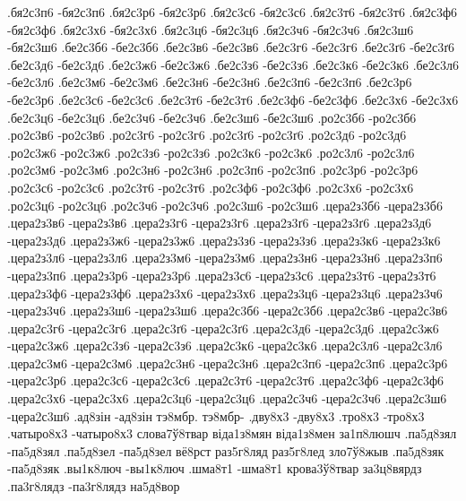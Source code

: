{.бя2с3п6 -бя2с3п6
.бя2с3р6 -бя2с3р6
.бя2с3с6 -бя2с3с6
.бя2с3т6 -бя2с3т6
.бя2с3ф6 -бя2с3ф6
.бя2с3х6 -бя2с3х6
.бя2с3ц6 -бя2с3ц6
.бя2с3ч6 -бя2с3ч6
.бя2с3ш6 -бя2с3ш6
.бе2с3б6 -бе2с3б6
.бе2с3в6 -бе2с3в6
.бе2с3г6 -бе2с3г6
.бе2с3ґ6 -бе2с3ґ6
.бе2с3д6 -бе2с3д6
.бе2с3ж6 -бе2с3ж6
.бе2с3з6 -бе2с3з6
.бе2с3к6 -бе2с3к6
.бе2с3л6 -бе2с3л6
.бе2с3м6 -бе2с3м6
.бе2с3н6 -бе2с3н6
.бе2с3п6 -бе2с3п6
.бе2с3р6 -бе2с3р6
.бе2с3с6 -бе2с3с6
.бе2с3т6 -бе2с3т6
.бе2с3ф6 -бе2с3ф6
.бе2с3х6 -бе2с3х6
.бе2с3ц6 -бе2с3ц6
.бе2с3ч6 -бе2с3ч6
.бе2с3ш6 -бе2с3ш6
.ро2с3б6 -ро2с3б6
.ро2с3в6 -ро2с3в6
.ро2с3г6 -ро2с3г6
.ро2с3ґ6 -ро2с3ґ6
.ро2с3д6 -ро2с3д6
.ро2с3ж6 -ро2с3ж6
.ро2с3з6 -ро2с3з6
.ро2с3к6 -ро2с3к6
.ро2с3л6 -ро2с3л6
.ро2с3м6 -ро2с3м6
.ро2с3н6 -ро2с3н6
.ро2с3п6 -ро2с3п6
.ро2с3р6 -ро2с3р6
.ро2с3с6 -ро2с3с6
.ро2с3т6 -ро2с3т6
.ро2с3ф6 -ро2с3ф6
.ро2с3х6 -ро2с3х6
.ро2с3ц6 -ро2с3ц6
.ро2с3ч6 -ро2с3ч6
.ро2с3ш6 -ро2с3ш6
.цера2з3б6 -цера2з3б6
.цера2з3в6 -цера2з3в6
.цера2з3г6 -цера2з3г6
.цера2з3ґ6 -цера2з3ґ6
.цера2з3д6 -цера2з3д6
.цера2з3ж6 -цера2з3ж6
.цера2з3з6 -цера2з3з6
.цера2з3к6 -цера2з3к6
.цера2з3л6 -цера2з3л6
.цера2з3м6 -цера2з3м6
.цера2з3н6 -цера2з3н6
.цера2з3п6 -цера2з3п6
.цера2з3р6 -цера2з3р6
.цера2з3с6 -цера2з3с6
.цера2з3т6 -цера2з3т6
.цера2з3ф6 -цера2з3ф6
.цера2з3х6 -цера2з3х6
.цера2з3ц6 -цера2з3ц6
.цера2з3ч6 -цера2з3ч6
.цера2з3ш6 -цера2з3ш6
.цера2с3б6 -цера2с3б6
.цера2с3в6 -цера2с3в6
.цера2с3г6 -цера2с3г6
.цера2с3ґ6 -цера2с3ґ6
.цера2с3д6 -цера2с3д6
.цера2с3ж6 -цера2с3ж6
.цера2с3з6 -цера2с3з6
.цера2с3к6 -цера2с3к6
.цера2с3л6 -цера2с3л6
.цера2с3м6 -цера2с3м6
.цера2с3н6 -цера2с3н6
.цера2с3п6 -цера2с3п6
.цера2с3р6 -цера2с3р6
.цера2с3с6 -цера2с3с6
.цера2с3т6 -цера2с3т6
.цера2с3ф6 -цера2с3ф6
.цера2с3х6 -цера2с3х6
.цера2с3ц6 -цера2с3ц6
.цера2с3ч6 -цера2с3ч6
.цера2с3ш6 -цера2с3ш6
%
%
%
.ад8зін -ад8зін
тэ8мбр. тэ8мбр-
.дву8х3 -дву8х3
.тро8х3 -тро8х3
.чатыро8х3 -чатыро8х3
слова7ў8твар
віда1з8мян
віда1з8мен
за1п8люшч
.па5д8зял -па5д8зял
.па5д8зел -па5д8зел
вё8рст
раз5г8ляд
раз5г8лед
зло7ў8жыв
.па5д8зяк -па5д8зяк
.вы1к8люч -вы1к8люч
.шма8т1 -шма8т1
крова3ў8твар
за3ц8вярдз
.па3г8лядз -па3г8лядз
на5д8вор
}

